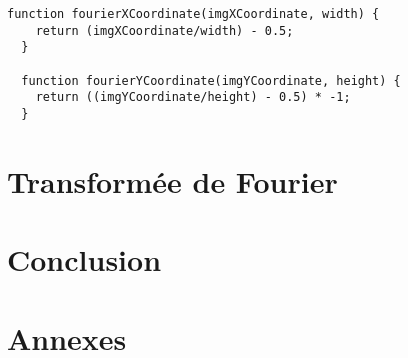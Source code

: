 \documentclass[a4paper,11pt]{article}
\begin{document}
  \begin{lstlisting}[caption=Fonctions de passage aux coordonnées dans le plan de Fourier]
  function fourierXCoordinate(imgXCoordinate, width) {
    return (imgXCoordinate/width) - 0.5;
  }

  function fourierYCoordinate(imgYCoordinate, height) {
    return ((imgYCoordinate/height) - 0.5) * -1;
  }
  \end{lstlisting}
  
  \section{Transformée de Fourier}
  
  \section*{Conclusion}
  
  \section*{Annexes}
  
\end{document}
